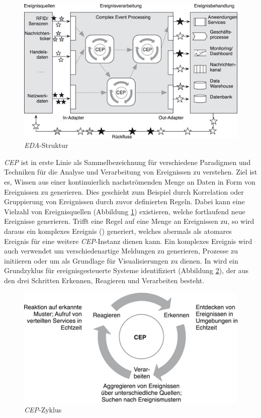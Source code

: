 \documentclass{acm_proc_article-sp}
\begin{document}
\begin{figure}[H]
    \centering
    \includegraphics[width=\linewidth]{img/eda-struktur-bruns.jpg}
    \caption{\textit{EDA}-Struktur}
    \label{img:eda-struktur}
\end{figure}

\textit{CEP} ist in erste Linie als Sammelbezeichnung für verschiedene Paradigmen und 
Techniken für die Analyse und Verarbeitung von Ereignissen zu verstehen. Ziel ist es, 
Wissen aus einer kontinuierlich nachströmenden Menge an Daten in Form von Ereignissen zu 
generieren. Dies geschieht zum Beispiel durch Korrelation oder Gruppierung von 
Ereignissen durch zuvor definierten Regeln. Dabei kann eine Vielzahl von 
Ereignisquellen (Abbildung \ref{img:eda-struktur}) existieren, welche fortlaufend neue 
Ereignisse generieren. Trifft eine Regel auf eine Menge an Ereignissen zu, so wird daraus 
ein komplexes Ereignis (\cite{glossary}) generiert, welches abermals als atomares 
Ereignis für eine weitere 
\textit{CEP}-Instanz dienen kann. Ein komplexes Ereignis wird auch verwendet
um verschiedenartige Meldungen zu generieren, Prozesse zu initiieren oder um als 
Grundlage 
für Visualisierungen zu dienen. In \cite{bruns} wird ein Grundzyklus für 
ereignisgesteuerte Systeme identifiziert (Abbildung \ref{img:cep-zyklus}), der aus den 
drei Schritten Erkennen, Reagieren und Verarbeiten besteht.

\begin{figure}[H]
    \centering
    \includegraphics[width=\linewidth]{img/cep-zyklus-bruns.jpg}
    \caption{\textit{CEP}-Zyklus}
    \label{img:cep-zyklus}
\end{figure}
\end{document}

